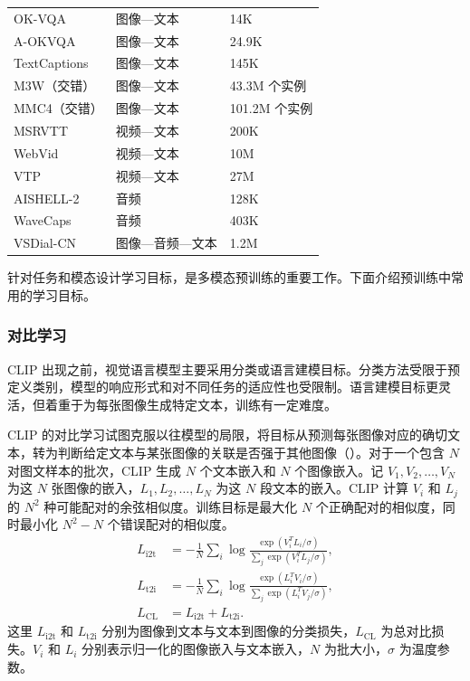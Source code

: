 {\begin{longtable}{@{}p{49mm}p{30mm}l@{}}
OK-VQA & 图像—文本 & 14K\\
A-OKVQA & 图像—文本 & 24.9K\\
TextCaptions & 图像—文本 & 145K\\
M3W（交错） & 图像—文本 & 43.3M 个实例\\
MMC4（交错） & 图像—文本 & 101.2M 个实例\\
MSRVTT & 视频—文本 & 200K\\
WebVid & 视频—文本 & 10M\\
VTP & 视频—文本 & 27M\\
AISHELL-2 & 音频 & 128K\\
WaveCaps & 音频 & 403K\\
VSDial-CN & 图像—音频—文本 & 1.2M\\
\end{longtable}
}

针对任务和模态设计学习目标，是多模态预训练的重要工作。下面介绍预训练中常用的学习目标。

\subsubsection{对比学习}
CLIP 出现之前，视觉语言模型主要采用分类或语言建模目标。分类方法受限于预定义类别，模型的响应形式和对不同任务的适应性也受限制。语言建模目标更灵活，但着重于为每张图像生成特定文本，训练有一定难度。

CLIP 的对比学习试图克服以往模型的局限，将目标从预测每张图像对应的确切文本，转为判断给定文本与某张图像的关联是否强于其他图像（）。对于一个包含 $N$ 对图文样本的批次，CLIP 生成 $N$ 个文本嵌入和 $N$ 个图像嵌入。记 $V_1,V_2,\ldots,V_N$ 为这 $N$ 张图像的嵌入，$L_1,L_2,\ldots,L_N$ 为这 $N$ 段文本的嵌入。CLIP 计算 $V_i$ 和 $L_j$ 的 $N^2$ 种可能配对的余弦相似度。训练目标是最大化 $N$ 个正确配对的相似度，同时最小化 $N^2-N$ 个错误配对的相似度。
\begin{align}
L_{\mathrm{i2t}}&=-\frac{1}{N}\sum_i
\log\frac{\exp(V_i^{T}L_i/\sigma)}{\sum_j\exp(V_i^{T}L_j/\sigma)},
\label{eq:ch09-image-to-text-loss}\\
L_{\mathrm{t2i}}&=-\frac{1}{N}\sum_i
\log\frac{\exp(L_i^{T}V_i/\sigma)}{\sum_j\exp(L_i^{T}V_j/\sigma)},
\label{eq:ch09-text-to-image-loss}\\
L_{\mathrm{CL}}&=L_{\mathrm{i2t}}+L_{\mathrm{t2i}}.
\label{eq:ch09-contrastive-loss}
\end{align}
这里 $L_{\mathrm{i2t}}$ 和 $L_{\mathrm{t2i}}$ 分别为图像到文本与文本到图像的分类损失，$L_{\mathrm{CL}}$ 为总对比损失。$V_i$ 和 $L_i$ 分别表示归一化的图像嵌入与文本嵌入，$N$ 为批大小，$\sigma$ 为温度参数。

